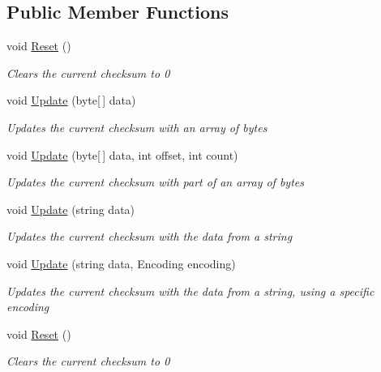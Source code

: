 \subsection*{Public Member Functions}
\begin{DoxyCompactItemize}
\item 
void \hyperlink{interface_dot_z_lib_1_1_checksum_generator_ad01fdc9c4b4e5512dec8bc5072d97ffb}{Reset} ()
\begin{DoxyCompactList}\small\item\em Clears the current checksum to 0 \end{DoxyCompactList}\item 
void \hyperlink{interface_dot_z_lib_1_1_checksum_generator_a10930844922e72671843dd5c97709394}{Update} (byte\mbox{[}$\,$\mbox{]} data)
\begin{DoxyCompactList}\small\item\em Updates the current checksum with an array of bytes \end{DoxyCompactList}\item 
void \hyperlink{interface_dot_z_lib_1_1_checksum_generator_aeba84b3ca367362cb45f4a267354b53e}{Update} (byte\mbox{[}$\,$\mbox{]} data, int offset, int count)
\begin{DoxyCompactList}\small\item\em Updates the current checksum with part of an array of bytes \end{DoxyCompactList}\item 
void \hyperlink{interface_dot_z_lib_1_1_checksum_generator_ac5a728d2dd56479b429648177607fd39}{Update} (string data)
\begin{DoxyCompactList}\small\item\em Updates the current checksum with the data from a string \end{DoxyCompactList}\item 
void \hyperlink{interface_dot_z_lib_1_1_checksum_generator_ab894f35764ea30031c616517a6a00391}{Update} (string data, Encoding encoding)
\begin{DoxyCompactList}\small\item\em Updates the current checksum with the data from a string, using a specific encoding \end{DoxyCompactList}\item 
void \hyperlink{interface_dot_z_lib_1_1_checksum_generator_ad01fdc9c4b4e5512dec8bc5072d97ffb}{Reset} ()
\begin{DoxyCompactList}\small\item\em Clears the current checksum to 0 \end{DoxyCompactList}\item 

\end{DoxyCompactItemize}
